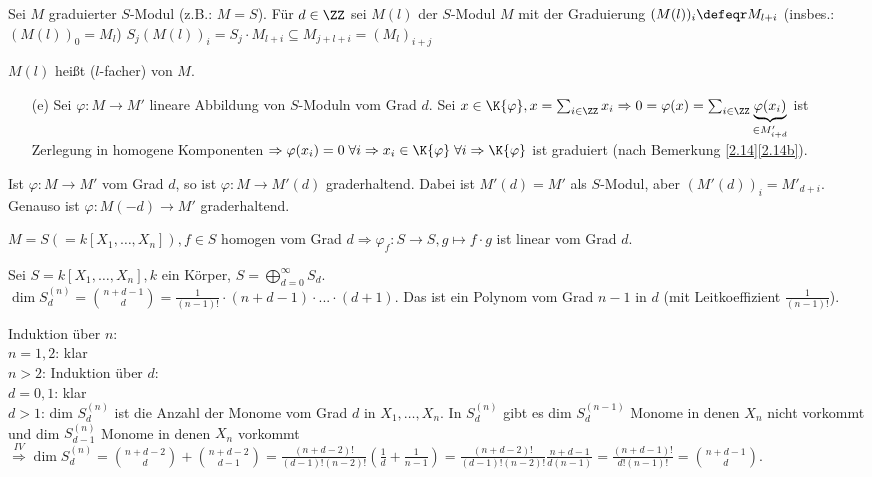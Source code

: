 \begin{nnBsp}
Sei $M$ graduierter $S$-Modul (z.B.: $M=S$). Für $d\in\ZZ$ sei
$M(l)$ der $S$-Modul $M$ mit der Graduierung $(M(l))_i\defeqr M_{l+i}$
(insbes.: $(M(l))_0=M_l$)
$S_j(M(l))_i=S_j\cdot M_{l+i}\subseteq M_{j+l+i}=(M_l)_{i+j}$

$M(l)$ heißt ($l$-facher)  von $M$.
\end{nnBsp}

\begin{Bew}
  \begin{enumerate}
    \item[(e)] Sei $\varphi: M \to M'$ lineare Abbildung von $S$-Moduln vom Grad
    $d$. Sei $x \in \K{\varphi}, x = \sum_{i \in \ZZ} x_i
    \Rightarrow 0 = \varphi(x) = \sum_{i \in \ZZ} \underset{\in M'_{i +
    d}}{\underbrace{\varphi(x_i)}}$ ist Zerlegung in homogene Komponenten
    $\Rightarrow \varphi(x_i) = 0 \; \forall i \Rightarrow x_i \in \K{\varphi} \; \forall i \Rightarrow \K{\varphi}$ ist graduiert
    (nach Bemerkung \ref{2.14}\ref{2.14b}).
  \end{enumerate}
\end{Bew}

\begin{Beo}
  Ist $\varphi: M \to M'$ vom Grad $d$, so ist $\varphi: M \to M'(d)$
  graderhaltend. Dabei ist $M'(d) = M'$ als $S$-Modul, aber $(M'(d))_i = M'_{d
  +i}$. Genauso ist $\varphi: M(-d) \to M'$ graderhaltend.
\end{Beo}

\begin{nnBsp}
  $M = S (=k[X_1, \dots, X_n]), f \in S$ homogen vom Grad $d \Rightarrow
  \varphi_f: S \to S, g \mapsto f \cdot g$ ist linear vom Grad $d$.
\end{nnBsp}

\begin{Prop}
  Sei $S = k[X_1, \dots, X_n], k$ ein Körper, $S = \bigoplus_{d = 0}^{\infty} S_d$.\\
  $\dim{S_d^{(n)}} = \binom{n+d-1}{d} = \frac{1}{(n-1)!} \cdot (n+d-1)
  \cdot ... 
  \cdot (d+1)$. Das ist ein Polynom vom Grad $n-1$ in $d$ (mit Leitkoeffizient
  $\frac{1}{(n-1)!}$).
\end{Prop}

\begin{Bew}
  Induktion über $n$:\\
  $n=1,2$: klar\\
  $n>2$:  Induktion über $d$:\\
  $d=0,1$: klar\\
  $d>1$: dim $S_d^{(n)}$ ist die Anzahl der Monome vom Grad $d$ in $X_1, \dots,
  X_n$. In $S_d^{(n)}$ gibt es dim $S_d^{(n-1)}$ Monome in denen $X_n$ nicht
  vorkommt und dim $S_{d-1}^{(n)}$ Monome in denen $X_n$ vorkommt
  $\overset{IV}{\Rightarrow} \dim{S_d^{(n)}} = \binom{n+d-2}{d} +
  \binom{n+d-2}{d-1} = \frac{(n+d-2)!}{(d-1)! (n-2)!} (\frac{1}{d} + \frac{1}{n-1}) =
  \frac{(n+d-2)!}{(d-1)! (n-2)!} \frac{n+d-1}{d(n-1)} = \frac{(n+d-1)!}{d!
  (n-1)!} = \binom{n+d-1}{d}$.
\end{Bew}

